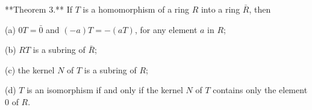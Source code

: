 **Theorem 3.** If $T$ is a homomorphism of a ring $R$ into a ring $\bar{R}$, then

(a) $0T = \bar{0}$ and $(-a)T = -(aT)$, for any element $a$ in $R$;

(b) $RT$ is a subring of $\bar{R}$;

(c) the kernel $N$ of $T$ is a subring of $R$;

(d) $T$ is an isomorphism if and only if the kernel $N$ of $T$ contains only the element $0$ of $R$.
